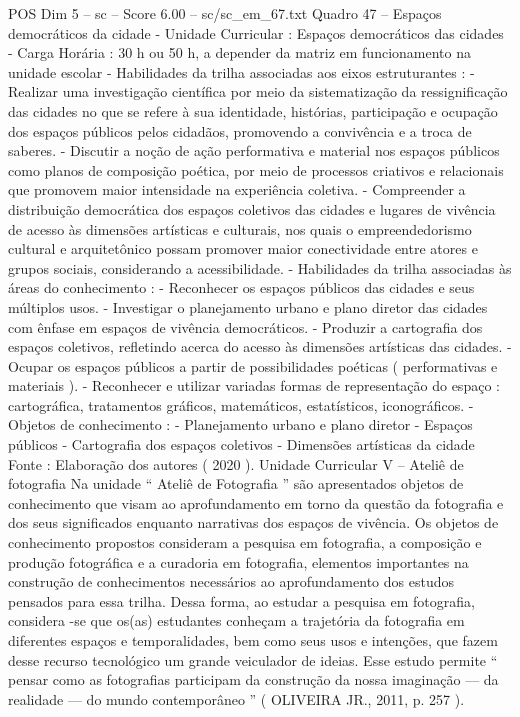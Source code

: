 \begin{textsample}{POS Dim 5 – sc – Score 6.00 – sc/sc\_em\_67.txt}
Quadro 47 – Espaços democráticos da cidade - Unidade Curricular : Espaços democráticos das cidades - Carga Horária : 30 h ou 50 h, a depender da matriz em funcionamento na unidade escolar - Habilidades da trilha associadas aos eixos estruturantes : - Realizar uma investigação científica por meio da sistematização da ressignificação das cidades no que se refere à sua identidade, histórias, participação e ocupação dos espaços públicos pelos cidadãos, promovendo a convivência e a troca de saberes. - Discutir a noção de ação performativa e material nos espaços públicos como planos de composição poética, por meio de processos criativos e relacionais que promovem maior intensidade na experiência coletiva. - Compreender a distribuição democrática dos espaços coletivos das cidades e lugares de vivência de acesso às dimensões artísticas e culturais, nos quais o empreendedorismo cultural e arquitetônico possam promover maior conectividade entre atores e grupos sociais, considerando a acessibilidade. - Habilidades da trilha associadas às áreas do conhecimento : - Reconhecer os espaços públicos das cidades e seus múltiplos usos. - Investigar o planejamento urbano e plano diretor das cidades com ênfase em espaços de vivência democráticos. - Produzir a cartografia dos espaços coletivos, refletindo acerca do acesso às dimensões artísticas das cidades. - Ocupar os espaços públicos a partir de possibilidades poéticas ( performativas e materiais ). - Reconhecer e utilizar variadas formas de representação do espaço : cartográfica, tratamentos gráficos, matemáticos, estatísticos, iconográficos. - Objetos de conhecimento : - Planejamento urbano e plano diretor - Espaços públicos - Cartografia dos espaços coletivos - Dimensões artísticas da cidade Fonte : Elaboração dos autores ( 2020 ).
Unidade Curricular V – Ateliê de fotografia Na unidade “ Ateliê de Fotografia ” são apresentados objetos de conhecimento que visam ao aprofundamento em torno da questão da fotografia e dos seus significados enquanto narrativas dos espaços de vivência.
Os objetos de conhecimento propostos consideram a pesquisa em fotografia, a composição e produção fotográfica e a curadoria em fotografia, elementos importantes na construção de conhecimentos necessários ao aprofundamento dos estudos pensados para essa trilha.
Dessa forma, ao estudar a pesquisa em fotografia, considera -se que os(as) estudantes conheçam a trajetória da fotografia em diferentes espaços e temporalidades, bem como seus usos e intenções, que fazem desse recurso tecnológico um grande veiculador de ideias.
Esse estudo permite “ pensar como as fotografias participam da construção da nossa imaginação — da realidade — do mundo contemporâneo ” ( OLIVEIRA JR., 2011, p. 257 ).

\end{textsample}
